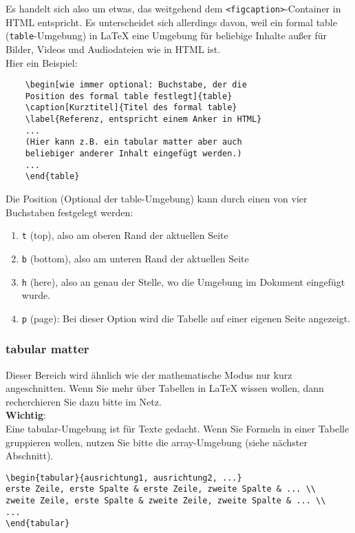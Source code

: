 Es handelt sich also um etwas, das weitgehend dem \verb|<figcaption>|-Container in HTML entspricht. Es unterscheidet sich allerdings davon, weil ein formal table (\verb|table|-Umgebung) in LaTeX eine Umgebung für beliebige Inhalte außer für Bilder, Videos und Audiodateien wie in HTML ist.\\

Hier ein Beispiel:

\begin{verbatim}
	\begin[wie immer optional: Buchstabe, der die 
	Position des formal table festlegt]{table}
	\caption[Kurztitel]{Titel des formal table}
	\label{Referenz, entspricht einem Anker in HTML}
	...
	(Hier kann z.B. ein tabular matter aber auch 
	beliebiger anderer Inhalt eingefügt werden.)
	...
	\end{table}
\end{verbatim}

Die Position (Optional der table-Umgebung) kann durch einen von vier Buchstaben festgelegt werden:

\begin{enumerate}
	\item \verb|t| (top), also am oberen Rand der aktuellen Seite
	\item \verb|b| (bottom), also am unteren Rand der aktuellen Seite
	\item \verb|h| (here), also an genau der Stelle, wo die Umgebung im Dokument eingefügt wurde.
	\item \verb|p| (page): Bei dieser Option wird die Tabelle auf einer eigenen Seite angezeigt.
\end{enumerate}

\subsubsection{tabular matter}

Dieser Bereich wird ähnlich wie der mathematische Modus nur kurz angeschnitten. Wenn Sie mehr über Tabellen in LaTeX wissen wollen, dann recherchieren Sie dazu bitte im Netz.\\

\textbf{Wichtig}:\\

Eine tabular-Umgebung ist für Texte gedacht. Wenn Sie Formeln in einer Tabelle gruppieren wollen, nutzen Sie bitte die array-Umgebung (siehe nächster Abschnitt).

\begin{verbatim}
\begin{tabular}{ausrichtung1, ausrichtung2, ...}
erste Zeile, erste Spalte & erste Zeile, zweite Spalte & ... \\
zweite Zeile, erste Spalte & zweite Zeile, zweite Spalte & ... \\
...
\end{tabular}
\end{verbatim}

